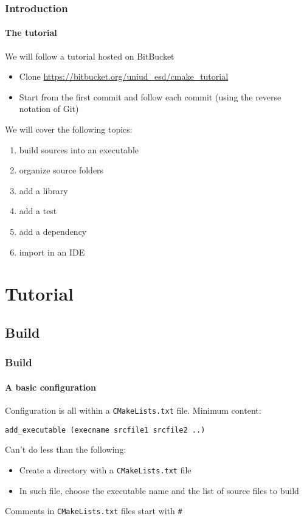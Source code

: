 \begin{frame}
\frametitle{Introduction}
\framesubtitle{The tutorial}

\begin{block}{We will follow a tutorial hosted on BitBucket}
\begin{itemize}
\item Clone \url{https://bitbucket.org/uniud_esd/cmake_tutorial}
\item Start from the first commit and follow each commit (using the reverse notation of Git)
\end{itemize}
\end{block}
\pause
\begin{block}{We will cover the following topics:}
\begin{enumerate}
\item build sources into an executable
\item organize source folders
\item add a library
\item add a test
\item add a dependency 
\item import in an IDE
\end{enumerate}
\end{block}
\end{frame}

\section{Tutorial}

\subsection{Build}

\begin{frame}[fragile]
\frametitle{Build}
\framesubtitle{A basic configuration}

Configuration is all within a \texttt{CMakeLists.txt} file. Minimum content:

\begin{verbatim}
add_executable (execname srcfile1 srcfile2 ..)
\end{verbatim}
  
\begin{block}{Can't do less than the following:}
\begin{itemize}
\item Create a directory with a \texttt{CMakeLists.txt} file
\item In such file, choose the executable name and the list of source files to build
\end{itemize}
Comments in \texttt{CMakeLists.txt} files start with \texttt{\#}
\end{block}

\end{frame}

